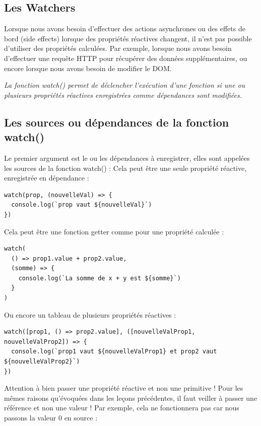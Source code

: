 \documentclass{article}
\begin{document}
\subsection{Les {\color{monOrange}Watchers}}
Lorsque nous avons besoin d'effectuer des actions asynchrones ou des effets de bord ({\color{monOrange}side effects}) lorsque des propriétés réactives changent, il n'est pas possible d'utiliser des propriétés calculées. Par exemple, lorsque nous avons besoin d'effectuer une requête HTTP pour récupérer des données supplémentaires, ou encore lorsque nous avons besoin de modifier le DOM.

{\em La fonction {\color{monOrange}watch()} permet de déclencher l'exécution d'une fonction si une ou plusieurs propriétés réactives enregistrées comme dépendances sont modifiées.}

\subsection{Les sources ou dépendances de la fonction {\color{monOrange}watch()}}
Le premier argument est le ou les dépendances à enregistrer, elles sont appelées les sources de la fonction {\color{monOrange}watch()} : Cela peut être une seule propriété réactive, enregistrée en dépendance :
\begin{verbatim}
watch(prop, (nouvelleVal) => {
  console.log(`prop vaut ${nouvelleVal}`)
})
\end{verbatim}
Cela peut être une fonction getter comme pour une propriété calculée :
\begin{verbatim}
watch(
  () => prop1.value + prop2.value,
  (somme) => {
    console.log(`La somme de x + y est ${somme}`)
  }
)
\end{verbatim}
Ou encore un tableau de plusieurs propriétés réactives :
\begin{verbatim}
watch([prop1, () => prop2.value], ([nouvelleValProp1, nouvelleValProp2]) => {
  console.log(`prop1 vaut ${nouvelleValProp1} et prop2 vaut ${nouvelleValProp2}`)
})
\end{verbatim}
Attention à bien passer une propriété réactive et non une primitive ! Pour les mêmes raisons qu'évoquées dans les leçons précédentes, il faut veiller à passer une référence et non une valeur ! Par exemple, cela ne fonctionnera pas car nous passons la valeur 0 en source :
\end{document}
